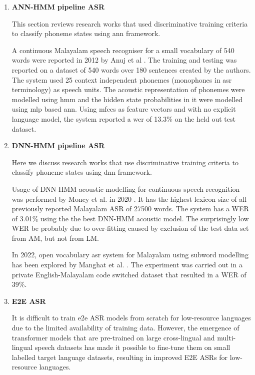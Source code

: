 \begin{enumerate}
    \item \textbf{ANN-HMM pipeline ASR}

    This section reviews research works that used discriminative training criteria to classify phoneme states using \gls{ann} framework.
    
 
    A continuous Malayalam speech recogniser for a small vocabulary of 540 words were reported in 2012 by Anuj et al \cite{mohamed_hmmann_2012}. The training and testing was reported on a dataset of 540 words over 180 sentences created by the authors. The system used 25 context independent phonemes (monophones in \gls{asr} terminology) as speech units. The acoustic representation of phonemes were modelled using \gls{hmm} and the hidden state probabilities in it were modelled using \gls{mlp} based \gls{ann}. Using \gls{mfcc}s as feature vectors and with no explicit language model, the system reported a \gls{wer} of 13.3\% on the held out test dataset.

    \item \textbf{DNN-HMM pipeline ASR}

    Here we discuss research works that use discriminative training criteria to classify phoneme states using \gls{dnn} framework.

    Usage of DNN-HMM acoustic modelling for continuous speech recognition was performed  by Moncy et al. in 2020 \cite{hanna_rajeev_2020}. It has the highest lexicon size of all previously reported Malayalam ASR of 27500 words. The system has a WER of 3.01\% using the the best DNN-HMM acoustic model. The surprisingly low WER be probably due to over-fitting caused by exclusion of the test data set from AM, but not from LM. 
    
    In 2022, open vocabulary \gls{asr} system for Malayalam using subword modelling has been explored by Manghat et al.  \cite{sreeja-hybrid-2022}. The experiment was carried out in a private English-Malayalam code switched dataset that resulted in a WER of 39\%.

    \item \textbf{E2E ASR}

It is difficult to train \gls{e2e} ASR models from scratch for low-resource languages due to the limited availability of training data. However, the emergence of transformer models that are pre-trained on large cross-lingual and multi-lingual speech datasets has made it possible to fine-tune them on small labelled target language datasets, resulting in improved E2E ASRs for low-resource languages.


\end{enumerate}
